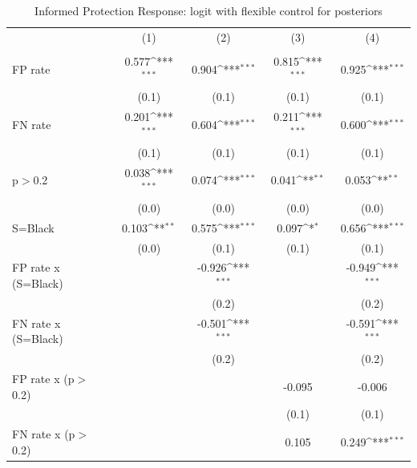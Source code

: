 \begin{table}[htbp]\centering
\def\sym#1{\ifmmode^{#1}\else\(^{#1}\)\fi}
\caption{Informed Protection Response: logit with flexible control for posteriors}
\begin{tabular}{l*{4}{c}}
\hline\hline
                &\multicolumn{1}{c}{(1)}&\multicolumn{1}{c}{(2)}&\multicolumn{1}{c}{(3)}&\multicolumn{1}{c}{(4)}\\
                &\multicolumn{1}{c}{}&\multicolumn{1}{c}{}&\multicolumn{1}{c}{}&\multicolumn{1}{c}{}\\
\hline
FP rate         &    0.577\sym{***}&    0.904\sym{***}&    0.815\sym{***}&    0.925\sym{***}\\
                &    (0.1)         &    (0.1)         &    (0.1)         &    (0.1)         \\
FN rate         &    0.201\sym{***}&    0.604\sym{***}&    0.211\sym{***}&    0.600\sym{***}\\
                &    (0.1)         &    (0.1)         &    (0.1)         &    (0.1)         \\
p$>$0.2         &    0.038\sym{***}&    0.074\sym{***}&    0.041\sym{**} &    0.053\sym{**} \\
                &    (0.0)         &    (0.0)         &    (0.0)         &    (0.0)         \\
S=Black         &    0.103\sym{**} &    0.575\sym{***}&    0.097\sym{*}  &    0.656\sym{***}\\
                &    (0.0)         &    (0.1)         &    (0.1)         &    (0.1)         \\
FP rate x (S=Black)&                  &   -0.926\sym{***}&                  &   -0.949\sym{***}\\
                &                  &    (0.2)         &                  &    (0.2)         \\
FN rate x (S=Black)&                  &   -0.501\sym{***}&                  &   -0.591\sym{***}\\
                &                  &    (0.2)         &                  &    (0.2)         \\
FP rate x (p$>$0.2)&                  &                  &   -0.095         &   -0.006         \\
                &                  &                  &    (0.1)         &    (0.1)         \\
FN rate x (p$>$0.2)&                  &                  &    0.105         &    0.249\sym{***}\\

\end{tabular}
\end{table}
